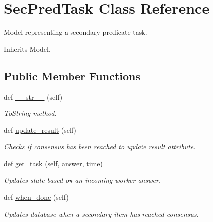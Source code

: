 \hypertarget{classjoinapp_1_1models_1_1task__management__models_1_1_sec_pred_task}{}\section{Sec\+Pred\+Task Class Reference}
\label{classjoinapp_1_1models_1_1task__management__models_1_1_sec_pred_task}


Model representing a secondary predicate task.  




Inherits Model.

\subsection*{Public Member Functions}
\begin{DoxyCompactItemize}
\item 
def \mbox{\hyperlink{classjoinapp_1_1models_1_1task__management__models_1_1_sec_pred_task_a23e8041ce1015febe4fdace3225714f9}{\+\_\+\+\_\+str\+\_\+\+\_\+}} (self)
\begin{DoxyCompactList}\small\item\em To\+String method. \end{DoxyCompactList}\item 
def \mbox{\hyperlink{classjoinapp_1_1models_1_1task__management__models_1_1_sec_pred_task_a9013f18300fef58695383b65dd3ad816}{update\+\_\+result}} (self)
\begin{DoxyCompactList}\small\item\em Checks if consensus has been reached to update result attribute. \end{DoxyCompactList}\item 
def \mbox{\hyperlink{classjoinapp_1_1models_1_1task__management__models_1_1_sec_pred_task_a5c2eb6f87a32af834dd29469a6189f0c}{get\+\_\+task}} (self, answer, \mbox{\hyperlink{classjoinapp_1_1models_1_1task__management__models_1_1_sec_pred_task_a70c092a6aebace0b1ea406e14da78a40}{time}})
\begin{DoxyCompactList}\small\item\em Updates state based on an incoming worker answer. \end{DoxyCompactList}\item 
def \mbox{\hyperlink{classjoinapp_1_1models_1_1task__management__models_1_1_sec_pred_task_a42e95b015208d401475b371d508ffd50}{when\+\_\+done}} (self)
\begin{DoxyCompactList}\small\item\em Updates database when a secondary item has reached consensus. \end{DoxyCompactList}\end{DoxyCompactItemize}
